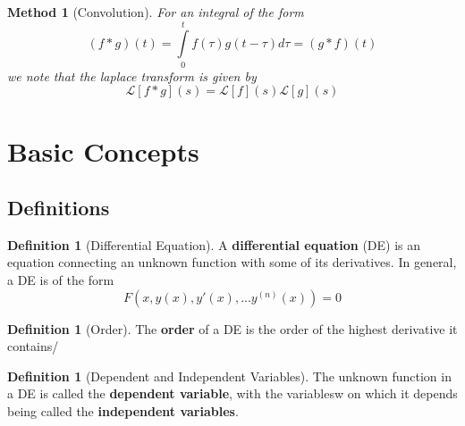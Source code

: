 \documentclass[12pt]{article}
\newtheorem{met}[thm]{Method}
\theoremstyle{definition}
\newtheorem{defn}[thm]{Definition}
\theoremstyle{remark}
\numberwithin{equation}{section}
\newcommand\B[1]{\textbf{ #1}}
\begin{document}
\vspace{1cm}

\begin{met}[Convolution]
        For an integral of the form \begin{equation}
                (f*g)(t) = \int\limits_0^tf(\tau)g(t-\tau)d\tau = (g*f)(t)
        \end{equation}
        we note that the laplace transform is given by \begin{equation}
                \mathcal{L}[f*g](s) = \mathcal{L}[f](s)\mathcal{L}[g](s)
        \end{equation}
\end{met}


\vspace{1cm}



\clearpage

\section{Basic Concepts}


\subsection{Definitions}

\begin{defn}[Differential Equation]
        A \B{differential equation} (DE) is an equation connecting an unknown function with some of its derivatives. In general, a DE is of the form \begin{equation}
                F(x,y(x),y'(x),...y^{(n)}(x)) = 0
        \end{equation}
\end{defn}

\vspace{1cm}

\begin{defn}[Order]
        The \B{order} of a DE is the order of the highest derivative it contains/
\end{defn}

\vspace{1cm}


\begin{defn}[Dependent and Independent Variables]
        The unknown function in a DE is called the \B{dependent variable}, with the variablesw on which it depends being called the \B{independent variables}.
\end{defn}
\end{document}
